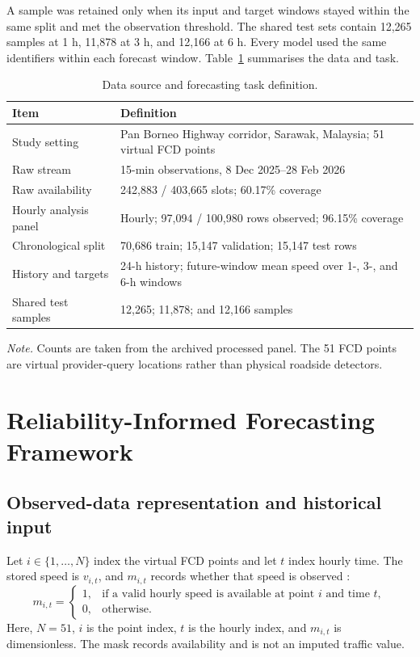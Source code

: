 \documentclass[smallcondensed]{svjour3}
\newcommand{\tabnote}[1]{\vspace{2pt}\parbox{0.94\textwidth}{\footnotesize\textit{Note.} #1}}
\begin{document}
A sample was retained only when its input and target windows stayed within the same split and met the observation threshold. The shared test sets contain 12,265 samples at 1 h, 11,878 at 3 h, and 12,166 at 6 h. Every model used the same identifiers within each forecast window. Table~\ref{tab:data} summarises the data and task.
\begin{table}[!htbp]
\caption{Data source and forecasting task definition.}\label{tab:data}
\centering\small
\begin{tabularx}{0.94\textwidth}{>{\raggedright\arraybackslash}p{}X}
\hline
\textbf{Item} & \textbf{Definition}\\
\hline
Study setting & Pan Borneo Highway corridor, Sarawak, Malaysia; 51 virtual FCD points\\
\hline
Raw stream & 15-min observations, 8 Dec 2025--28 Feb 2026\\
\hline
Raw availability & 242,883 / 403,665 slots; 60.17\% coverage\\
\hline
Hourly analysis panel & Hourly; 97,094 / 100,980 rows observed; 96.15\% coverage\\
\hline
Chronological split & 70,686 train; 15,147 validation; 15,147 test rows\\
\hline
History and targets & 24-h history; future-window mean speed over 1-, 3-, and 6-h windows\\
\hline
Shared test samples & 12,265; 11,878; and 12,166 samples\\
\hline
\end{tabularx}
\tabnote{Counts are taken from the archived processed panel. The 51 FCD points are virtual provider-query locations rather than physical roadside detectors.}
\end{table}



\section{Reliability-Informed Forecasting Framework}
\subsection{Observed-data representation and historical input}
Let $i\in\{1,\ldots,N\}$ index the virtual FCD points and let $t$ index hourly time. The stored speed is $v_{i,t}$, and $m_{i,t}$ records whether that speed is observed \cite{ref7,ref9}:
\begin{equation}
m_{i,t}=
\begin{cases}
1, & \text{if a valid hourly speed is available at point }i\text{ and time }t,\\
0, & \text{otherwise.}
\end{cases}
\label{eq:mask}
\end{equation}
Here, $N=51$, $i$ is the point index, $t$ is the hourly index, and $m_{i,t}$ is dimensionless. The mask records availability and is not an imputed traffic value.
\end{document}
